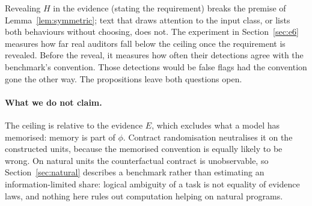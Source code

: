 Revealing $H$ in the evidence (stating the requirement) breaks the premise of Lemma~\ref{lem:symmetric}; text that
draws attention to the input class, or lists both behaviours without choosing, does not. The experiment in
Section~\ref{sec:e6} measures how far real auditors fall below the ceiling once the requirement is revealed.
Before the reveal, it measures how often their detections agree with the benchmark's convention.
Those detections would be false flags had the convention gone the other way. The propositions leave both questions open.

\paragraph{What we do not claim.}
The ceiling is relative to the evidence $E$, which excludes what a model has memorised: memory is part of $\phi$.
Contract randomisation neutralises it on the constructed units, because the memorised convention is equally likely
to be wrong. On natural units the
counterfactual contract is unobservable, so Section~\ref{sec:natural} describes a benchmark rather than estimating an
information-limited share: logical ambiguity of a task is not equality of evidence laws, and nothing here rules out
computation helping on natural programs.
